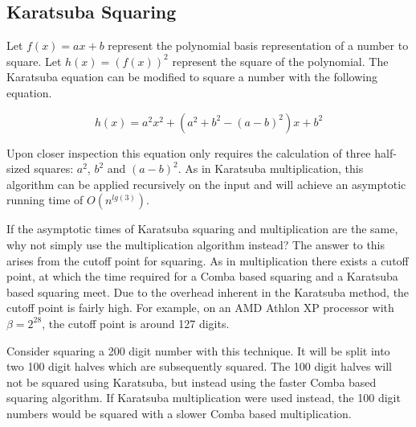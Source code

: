 \documentclass[b5paper]{book}
\begin{document}
\subsection{Karatsuba Squaring}
Let $f(x) = ax + b$ represent the polynomial basis representation of a number to square.  
Let $h(x) = \left ( f(x) \right )^2$ represent the square of the polynomial.  The Karatsuba equation can be modified to square a 
number with the following equation.

\begin{equation}
h(x) = a^2x^2 + \left (a^2 + b^2 - (a - b)^2 \right )x + b^2
\end{equation}

Upon closer inspection this equation only requires the calculation of three half-sized squares: $a^2$, $b^2$ and $(a - b)^2$.  As in 
Karatsuba multiplication, this algorithm can be applied recursively on the input and will achieve an asymptotic running time of 
$O \left ( n^{lg(3)} \right )$.

If the asymptotic times of Karatsuba squaring and multiplication are the same, why not simply use the multiplication algorithm 
instead?  The answer to this arises from the cutoff point for squaring.  As in multiplication there exists a cutoff point, at which the 
time required for a Comba based squaring and a Karatsuba based squaring meet.  Due to the overhead inherent in the Karatsuba method, the cutoff 
point is fairly high.  For example, on an AMD Athlon XP processor with $\beta = 2^{28}$, the cutoff point is around 127 digits.  

Consider squaring a 200 digit number with this technique.  It will be split into two 100 digit halves which are subsequently squared.  
The 100 digit halves will not be squared using Karatsuba, but instead using the faster Comba based squaring algorithm.  If Karatsuba multiplication
were used instead, the 100 digit numbers would be squared with a slower Comba based multiplication.  
\end{document}
